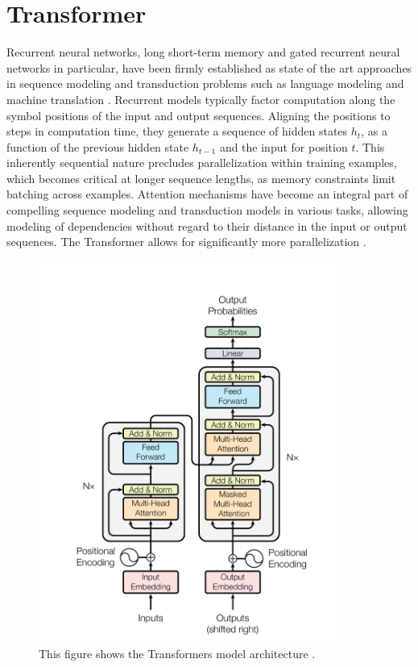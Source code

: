 \section{Transformer}

Recurrent neural networks, long short-term memory and gated recurrent neural networks
in particular, have been firmly established as state of the art approaches in sequence modeling and
transduction problems such as language modeling and machine translation \cite{trans2}.
Recurrent models typically factor computation along the symbol positions of the input and output
sequences. Aligning the positions to steps in computation time, they generate a sequence of hidden
states $h_t$, as a function of the previous hidden state $h_{t-1}$
and the input for position $t$. This inherently
sequential nature precludes parallelization within training examples, which becomes critical at longer
sequence lengths, as memory constraints limit batching across examples.
Attention mechanisms \cite{attention} have become an integral part of compelling sequence modeling and transduction models in various tasks, allowing modeling of dependencies without regard to their distance in
the input or output sequences.
The Transformer allows for significantly more parallelization \cite{trans1}.

\begin{figure}[H]
	\centering
	\includegraphics[width=10cm, keepaspectratio]{chapters/1_introduction/imgs/transformers.png}
	\caption{This figure shows the Transformers model architecture \cite{attention}.}
	\label{fig:transarch}
\end{figure}

